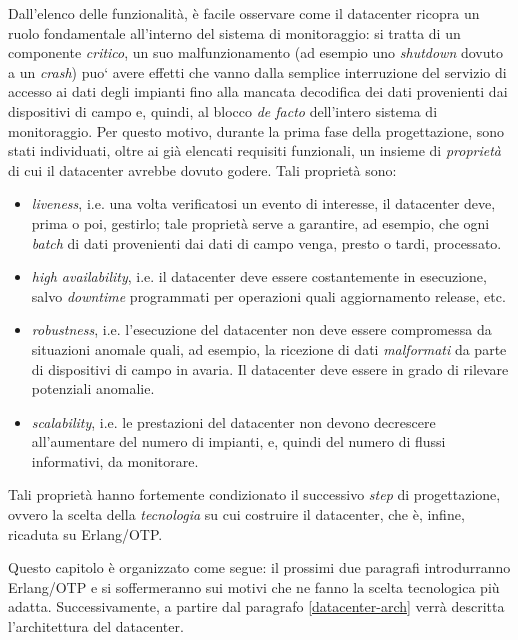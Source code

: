 %
Dall'elenco delle funzionalit\`a, \`e facile osservare come il
datacenter ricopra un ruolo fondamentale all'interno del sistema di monitoraggio: 
si tratta di un componente \emph{critico}, un suo malfunzionamento 
(ad esempio uno \emph{shutdown} dovuto a un \emph{crash}) puo` avere effetti che 
vanno dalla semplice interruzione del servizio di accesso ai dati degli impianti 
fino alla mancata decodifica dei dati provenienti dai dispositivi di campo e, 
quindi, al blocco \emph{de facto} dell'intero sistema di monitoraggio.
%
Per questo motivo, durante la prima fase della progettazione, sono stati 
individuati, oltre ai gi\`a elencati requisiti funzionali, un insieme di 
\emph{propriet\`a} di cui il datacenter avrebbe dovuto godere. Tali propriet\`a 
sono:
%
\begin{itemize}
\item \emph{liveness}, i.e. una volta verificatosi un evento di interesse, 
il datacenter deve, prima o poi, gestirlo; tale propriet\`a serve a garantire, ad 
esempio, che ogni \emph{batch} di dati provenienti dai dati di campo venga, 
presto o tardi, processato.
%
\item \emph{high availability}, i.e. il datacenter deve essere costantemente 
in esecuzione, salvo \emph{downtime} programmati per operazioni quali 
aggiornamento release, etc.
%
\item \emph{robustness}, i.e. l'esecuzione del datacenter non deve essere 
compromessa da situazioni anomale quali, ad esempio, la ricezione di dati 
\emph{malformati} da parte di dispositivi di campo in avaria. Il datacenter 
deve essere in grado di rilevare potenziali anomalie.%
%
\item \emph{scalability}, i.e. le prestazioni del datacenter non devono 
decrescere all'aumentare del numero di impianti, e, quindi del numero di 
flussi informativi, da monitorare. %
%
\end{itemize}
%

%
Tali propriet\`a hanno fortemente condizionato il successivo \emph{step} di
progettazione, ovvero la scelta della \emph{tecnologia} su cui costruire il 
datacenter, che \`e, infine, ricaduta su Erlang/OTP.
%

%
Questo capitolo \`e organizzato come segue: il prossimi due paragrafi
introdurranno Erlang/OTP e si soffermeranno sui motivi che ne fanno la scelta 
tecnologica pi\`u adatta. Successivamente, a partire dal paragrafo 
\ref{datacenter-arch} verr\`a descritta l'architettura del datacenter.
%


